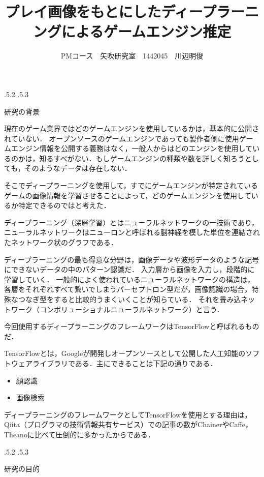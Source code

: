 \documentclass[uplatex]{jsarticle}
\title{\vspace{-14mm}プレイ画像をもとにしたディープラーニングによるゲームエンジン推定}
\author{PMコース　矢吹研究室　1442045　川辺明俊}
\date{}%
\makeatletter
\renewcommand{\section}{%
    \if@slide\clearpage\fi
    \@startsection{section}{1}{\z@}%
    {\Cvs \@plus.5\Cdp \@minus.2\Cdp}%
    {.5\Cvs \@plus.3\Cdp}%
    {\normalfont\raggedright}}
\makeatother
\begin{document}
\maketitle

\section{研究の背景}

現在のゲーム業界ではどのゲームエンジンを使用しているかは，基本的に公開されていない．
オープンソースのゲームエンジンであっても製作者側に使用ゲームエンジン情報を公開する義務はなく，一般人からはどのエンジンを使用しているのかは，知るすべがない．もしゲームエンジンの種類や数を詳しく知ろうとしても，そのようなデータは存在しない．

そこでディープラーニングを使用して，すでにゲームエンジンが特定されているゲームの画像情報を学習させることによって，どのゲームエンジンを使用しているか特定できるのではと考えた．

ディープラーニング（深層学習）とはニューラルネットワークの一技術であり，ニューラルネットワークはニューロンと呼ばれる脳神経を模した単位を連結されたネットワーク状のグラフである．

ディープラーニングの最も得意な分野は，画像データや波形データのような記号にできないデータの中のパターン認識だ．
入力層から画像を入力し，段階的に学習していく．
一般的によく使われているニューラルネットワークの構造は，各層をそれぞれすべて繋いでしまうパーセプトロン型だが，画像認識の場合，特殊なつなぎ型をすると比較的うまくいくことが知らている．
それを畳み込ネットワーク（コンボリューショナルニューラルネットワーク）と言う\cite{abalab}．

今回使用するディープラーニングのフレームワークはTensorFlowと呼ばれるものだ．

TensorFlowとは，Googleが開発しオープンソースとして公開した人工知能のソフトウェアライブラリである\cite{wiki}．主にできることは下記の通りである．
\begin{itemize} 
\item 顔認識
\item 画像検索
\end{itemize}

ディープラーニングのフレームワークとしてTensorFlowを使用とする理由は，Qiita（プログラマの技術情報共有サービス）での記事の数がChainerやCaffe，Theanoに比べて圧倒的に多かったからである．

\section{研究の目的}
\end{document}
